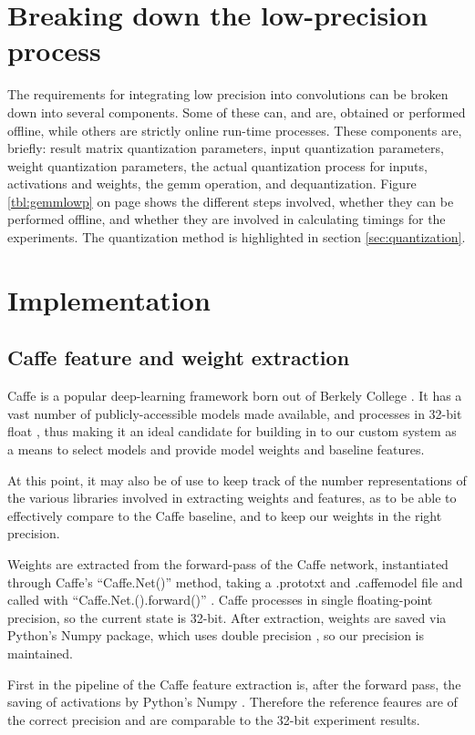 \section{Breaking down the low-precision process}
The requirements for integrating low precision into convolutions can be broken down into several components. Some of these can, and are, obtained or performed offline, while others are strictly online run-time processes. These components are, briefly: result matrix quantization parameters, input quantization parameters, weight quantization parameters, the actual quantization process for inputs, activations and weights, the gemm operation, and dequantization. Figure \ref{tbl:gemmlowp} on page \pageref{tbl:gemmlowp} shows the different steps involved, whether they can be performed offline, and whether they are involved in calculating timings for the experiments. The quantization method is highlighted in section \ref{sec:quantization}.

\section{Implementation}
\subsection{Caffe feature and weight extraction}
\label{sec:caffe}
Caffe is a popular deep-learning framework born out of Berkely College \cite{caffe}. It has a vast number of publicly-accessible models made available, and processes in 32-bit float \cite{caffe}, thus making it an ideal candidate for building in to our custom system as a means to select models and provide model weights and baseline features.

At this point, it may also be of use to keep track of the number representations of the various libraries involved in extracting weights and features, as to be able to effectively compare to the Caffe baseline, and to keep our weights in the right precision.

Weights are extracted from the forward-pass of the Caffe network, instantiated through Caffe's ``Caffe.Net()'' method, taking a .prototxt and .caffemodel file and called with ``Caffe.Net.().forward()'' \cite{caffe}. Caffe processes in single floating-point precision, so the current state is 32-bit. After extraction, weights are saved via Python's Numpy package, which uses double precision \cite{scipy}, so our precision is maintained.

First in the pipeline of the Caffe feature extraction is, after the forward pass, the saving of activations by Python's Numpy \cite{scipy}. Therefore the reference feaures are of the correct precision and are comparable to the 32-bit experiment results.

